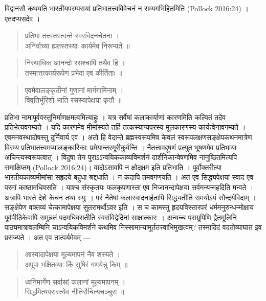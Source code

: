 {\dev विद्वानसौ कथयति भारतीयपरम्परायां प्रतिभातत्त्वविवेचनं न सम्यगभिहितमिति} (Pollock 2016:24) {\dev । एतदप्यसदेव ।}
\begin{quote}
{\dev प्रतिभा तत्त्वतस्त्वन्ते स्वसंवेदनचेतना ।}\\
{\dev अनिर्वाच्या ह्यतस्तस्याः कार्यमेव निरूप्यते ॥}
\end{quote}
\begin{quote}
{\dev निरुपाधिक आनन्दो रसश्चापि तथैव हि ।}\\
{\dev तस्मात्तत्कार्यरूपेण प्रभेदा एव कीर्तिताः ॥}
\end{quote}
\begin{quote}
{\dev एवमेवालङ्कृतीनां गुणानां मार्गगामिनाम् ।}\\
{\dev विवृतिर्भूरिशो भाति रसस्यापेक्षया कृतौ ॥}
\end{quote}

{\dev प्रतिभा नामापूर्ववस्तुनिर्माणक्षमत्वमित्याहुः । यत्र सर्वेषां कलाकार्याणां कारणमिति कल्पितं तदेव प्रतिभेत्यवगम्यते । यदि कारणमेव मीमांस्यते तर्हि तत्कस्याप्यपरस्य मूलकारणस्य कार्यत्वेनावगम्यते । एवमनवस्थादोषस्तु दुर्निवार्य एव । अतो हि वेदान्ते ब्रह्मस्वरूपमिव केवलं स्वरूपलक्षणसङ्क्षेपकथनमात्रेण विरम्य प्रतिभातत्त्वमप्यालङ्कारिकाः प्रमेयान्तरमूरी\-कुर्वन्ति । नैतत्तावद्दूषणं प्रत्युत भूषणमेव प्रतिभाया अचिन्त्यस्वरूपत्वात् । विदुषा तेन पुराऽऽन्वयिककाव्यविमर्शनं दार्शनिकान्वेषणमिव नानुष्ठितमित्यपि समाक्षिप्तम्} (Pollock 2016:24){\dev । वादोऽसावपि न क्षोदक्षम इति प्रतिभाति । पूर्वोक्तरीत्या भारतीयकाव्यमीमांसा सहृदये बहुधा श्रद्दधाति । न कदापि तमवगणयति । अत एव सिद्ध्यपेक्षया स्वाद एव परमां काष्ठामधिवसति । याश्च संस्कृतयः फलकृपणास्ता एव निजानन्दापेक्षया सर्वमन्यन्महदिति मन्वते । अत्रापि भारते देशे केचन तथा स्युः । परं नैतेषां कलास्वादनार्हतापि सिद्ध्यतीति समयोऽयं सौन्दर्यविदाम् । सङ्क्षेपेण वक्तव्यं चेत्कामापेक्षया सुतरामर्थोऽवर इति । स च कामस्तु हृदयविस्तारपरं धर्ममनुरुन्धन्मोक्षाय पूर्वपीठिकेवापि समुन्नतं पदमधिवसतीति स्वसंविद्वेदिनां साक्षात्कारः । अन्यच्च पराग्रूपिणि द्वैतमूलिनि पाठ्यमात्रावलम्बिनि चाऽन्वयिकविमर्शने कथमिव निस्सामान्यामूर्ततत्त्वाभिमुखत्वम्? तस्मादिदं वदतोव्याघात इव प्रसज्यते । अत एव तात्पर्यमेवम् ---}   
\begin{quote}
{\dev आस्वादापेक्षया मूल्यमापनं नैव शस्यते ।}\\
{\dev अपूपा भक्षितव्याः किं सुषिरं गणयेन्नु किम् ॥}
\end{quote}
\begin{quote}
{\dev ध्वनिमार्गेण सर्वासां कलानां मूल्यमापनम् ।}\\
{\dev सिद्धमित्यपरास्त्येव नीतिरौचित्यचञ्चुरा ॥}
\end{quote}

